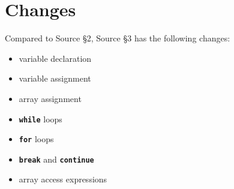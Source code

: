 





\section*{Changes}

Compared to Source \S 2, Source \S 3 has the following changes:
\begin{itemize}
\item variable declaration
\item variable assignment
\item array assignment
\item \textbf{\texttt{while}} loops
\item \textbf{\texttt{for}} loops
\item \textbf{\texttt{break}} and \textbf{\texttt{continue}}
\item array access expressions
\end{itemize}



